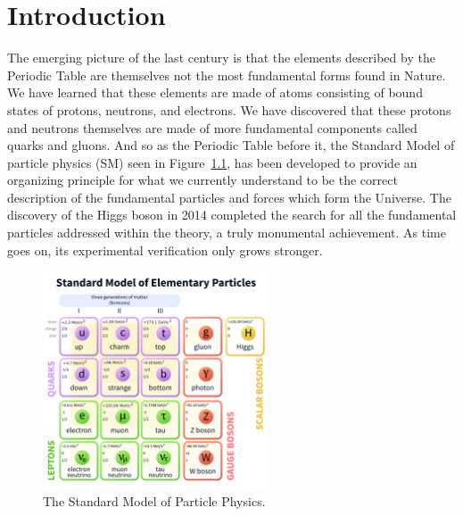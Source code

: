 \chapter{Introduction}

The emerging picture of the last century is that the elements described by the Periodic Table are themselves not the most fundamental forms found in Nature. We have learned that these elements are made of atoms consisting of bound states of protons, neutrons, and electrons. We have discovered that these protons and neutrons themselves are made of more fundamental components called quarks and gluons. And so as the Periodic Table before it, the Standard Model of particle physics (SM) seen in Figure~\ref{fig:sm}, has been developed to provide an organizing principle for what we currently understand to be the correct description of the fundamental particles and forces which form the Universe. The discovery of the Higgs boson in 2014 \cite{higgsdisc} completed the search for all the fundamental particles addressed within the theory, a truly monumental achievement. As time goes on, its experimental verification only grows stronger.

\begin{figure}
\centering
\includegraphics[width=0.6\textwidth]{figs/StandardModelofElementaryParticles.pdf}
\caption{The Standard Model of Particle Physics.}
\label{fig:sm}
\end{figure}

